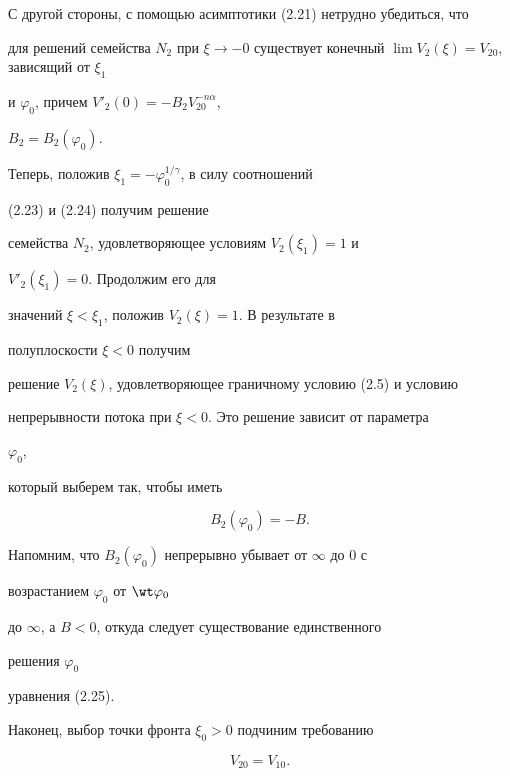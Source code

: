  


С другой стороны, с помощью асимптотики (2.21) нетрудно убедиться, что 


для решений семейства $N_2$ при $\xi\to-0$ существует конечный $\lim 


V_2(\xi)=V_{20}$, зависящий от $\xi_1$ 


и $\varphi_0$, причем $V'_2(0)=-B_2V^{-n\alpha}_{20}$, 


$B_2=B_2(\varphi_0)$. 


 


Теперь, положив $\xi_1=-\varphi^{1/\gamma}_0$, в силу соотношений 


(2.23) и (2.24) получим решение 


семейства $N_2$, удовлетворяющее условиям $V_2(\xi_1)=1$ и 


$V'_2(\xi_1)=0$. Продолжим его для 


значений $\xi<\xi_1$, положив $V_2(\xi)=1$. В результате в 


полуплоскости $\xi<0$ получим 


решение $V_2(\xi)$, удовлетворяющее граничному условию (2.5) и условию 


непрерывности потока при $\xi<0$. Это решение зависит от параметра 


$\varphi_0$, 


который выберем так, чтобы иметь 


\begin{equation} 


B_2(\varphi_0)=-B.\tag{2.25} 


\end{equation} 


Напомним, что $B_2(\varphi_0)$ непрерывно убывает от $\infty$ до 0 с 


возрастанием $\varphi_0$ от $\wt\varphi_0$ 


до $\infty$, а $B<0$, откуда следует существование единственного 


решения $\varphi_0$ 


уравнения (2.25). 


 


Наконец, выбор точки фронта $\xi_0>0$ подчиним требованию 


\begin{equation} 


V_{20}=V_{10}.\tag{2.26} 


\end{equation} 


